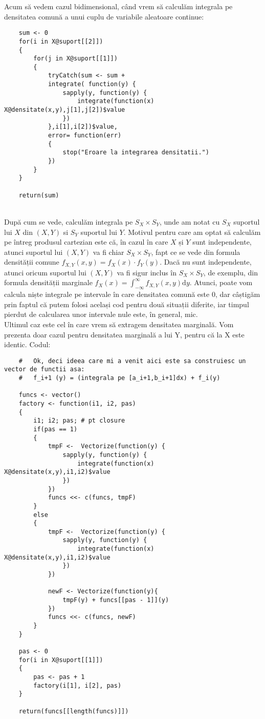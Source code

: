 \documentclass[12pt]{article}
\begin{document}
\indent Acum să vedem cazul bidimensional, când vrem să calculăm integrala pe densitatea comună a unui cuplu de variabile aleatoare continue:
\begin{lstlisting}
	sum <- 0
	for(i in X@suport[[2]])
	{
		for(j in X@suport[[1]])
		{
			tryCatch(sum <- sum +
			integrate( function(y) {
				sapply(y, function(y) {
					integrate(function(x) X@densitate(x,y),j[1],j[2])$value
				})
			},i[1],i[2])$value,
			error= function(err)
			{
				stop("Eroare la integrarea densitatii.")
			})
		}
	}
	
	return(sum)
\end{lstlisting}\hfill \\
\indent După cum se vede, calculăm integrala pe $S_{X} \times S_{Y}$, unde am notat cu $S_{X}$ suportul lui $X$ din $(X, Y)$ si $S_{Y}$ suportul lui $Y$. Motivul pentru care am optat să calculăm pe întreg produsul cartezian este că, în cazul în care $X$ și $Y$ sunt independente, atunci suportul lui $(X, Y)$ va fi chiar $S_{X} \times S_{Y}$, fapt ce se vede din formula densității comune $f_{X,Y}(x,y) = f_{X}(x) \cdot f_{Y}(y)$. Dacă nu sunt independente, atunci oricum suportul lui $(X, Y)$ va fi sigur inclus în $S_{X} \times S_{Y}$, de exemplu, din formula densității marginale $\displaystyle f_{X}(x) = \int_{-\infty}^{\infty}f_{X,Y}(x,y)\mathrm{d}y$. Atunci, poate vom calcula niște integrale pe intervale în care densitatea comună este 0, dar câștigăm prin faptul că putem folosi același cod pentru două situații diferite, iar timpul pierdut de calcularea unor intervale nule este, în general, mic.\\
\indent Ultimul caz este cel în care vrem să extragem densitatea marginală. Vom prezenta doar cazul pentru densitatea marginală a lui Y, pentru că la X este identic. Codul:\\
\begin{lstlisting}
	#   Ok, deci ideea care mi a venit aici este sa construiesc un vector de functii asa:
	#   f_i+1 (y) = (integrala pe [a_i+1,b_i+1]dx) + f_i(y)
	
	funcs <- vector()
	factory <- function(i1, i2, pas)
	{
		i1; i2; pas; # pt closure
		if(pas == 1)
		{
			tmpF <-  Vectorize(function(y) {
				sapply(y, function(y) {
					integrate(function(x) X@densitate(x,y),i1,i2)$value
				})
			})
			funcs <<- c(funcs, tmpF)
		}
		else
		{
			tmpF <-  Vectorize(function(y) {
				sapply(y, function(y) {
					integrate(function(x) X@densitate(x,y),i1,i2)$value
				})
			})
			
			newF <- Vectorize(function(y){
				tmpF(y) + funcs[[pas - 1]](y)
			})
			funcs <<- c(funcs, newF)
		}
	}
	
	pas <- 0
	for(i in X@suport[[1]])
	{
		pas <- pas + 1
		factory(i[1], i[2], pas)
	}
	
	return(funcs[[length(funcs)]])
\end{lstlisting} \hfill \\
\end{document}
